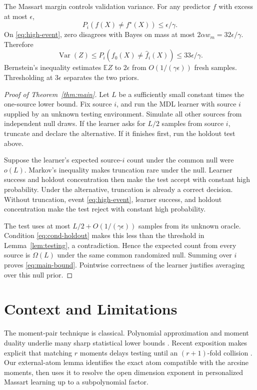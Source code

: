 \documentclass[twoside]{article}
\newcommand{\E}{\mathbb E}
\newcommand{\1}{\mathbf 1}
\begin{document}
The Massart margin controls validation variance. For any predictor $f$ with excess at most $\epsilon$,
\begin{equation}
 P_i(f(X)\ne f^\star(X))\le\epsilon/\gamma.
 \label{eq:disagreement}
\end{equation}
On \eqref{eq:high-event}, zero disagrees with Bayes on mass at most $2\alpha w_m=32\epsilon/\gamma$. Therefore
\begin{equation}
 \operatorname{Var}(Z)\le
 P_i(f_0(X)\ne\widehat f_i(X))\le33\epsilon/\gamma.
 \label{eq:validation-variance}
\end{equation}
Bernstein's inequality estimates $\E Z$ to $2\epsilon$ from $O(1/(\gamma\epsilon))$ fresh samples. Thresholding at $3\epsilon$ separates the two priors.

\begin{proof}[Proof of Theorem~\ref{thm:main}]
Let $L$ be a sufficiently small constant times the one-source lower bound. Fix source $i$, and run the MDL learner with source $i$ supplied by an unknown testing environment. Simulate all other sources from independent null draws. If the learner asks for $L/2$ samples from source $i$, truncate and declare the alternative. If it finishes first, run the holdout test above.

Suppose the learner's expected source-$i$ count under the common null were $o(L)$. Markov's inequality makes truncation rare under the null. Learner success and holdout concentration then make the test accept with constant high probability. Under the alternative, truncation is already a correct decision. Without truncation, event \eqref{eq:high-event}, learner success, and holdout concentration make the test reject with constant high probability.

The test uses at most $L/2+O(1/(\gamma\epsilon))$ samples from its unknown oracle. Condition \eqref{eq:cond-holdout} makes this less than the threshold in Lemma~\ref{lem:testing}, a contradiction. Hence the expected count from every source is $\Omega(L)$ under the same common randomized null. Summing over $i$ proves \eqref{eq:main-bound}. Pointwise correctness of the learner justifies averaging over this null prior.
\end{proof}

\section{Context and Limitations}
\label{sec:discussion}

The moment-pair technique is classical. Polynomial approximation and moment duality underlie many sharp statistical lower bounds \citep{wu2019chebyshev,wu2020polynomial}. Recent exposition makes explicit that matching $r$ moments delays testing until an $(r+1)$-fold collision \citep{canonne2026short}. Our external-atom lemma identifies the exact atom compatible with the arcsine moments, then uses it to resolve the open dimension exponent in personalized Massart learning up to a subpolynomial factor.
\end{document}
